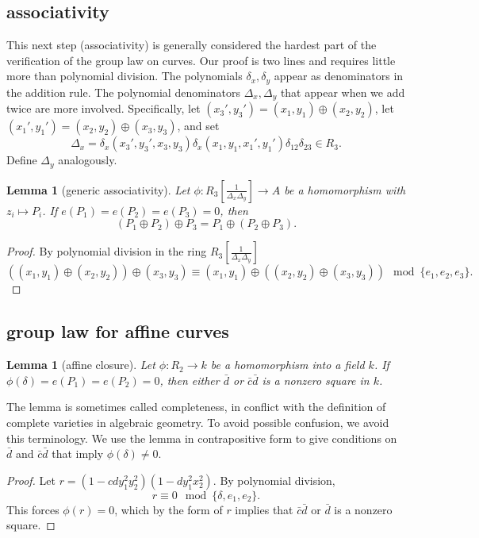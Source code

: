 \documentclass[12pt]{article}
\newtheorem{lemma}[theorem]{Lemma}
\newcommand{\f}[1]{\frac{1}{#1}}
\begin{document}
\subsection{associativity}

This next step (associativity) is generally considered the hardest
part of the verification of the group law on curves.  Our proof is two
lines and requires little more than polynomial division.  The
polynomials $\delta_x,\delta_y$ appear as denominators in the addition
rule.  The polynomial denominators $\Delta_x,\Delta_y$ that appear
when we add twice are more involved.  Specifically, let $
(x_3',y_3')=(x_1,y_1) \oplus (x_2,y_2)$, let $(x_1',y_1')=(x_2,y_2)
\oplus (x_3,y_3) $, and set
\[
\Delta_x = \delta_x(x_3',y_3',x_3,y_3)
\delta_x(x_1,y_1,x_1',y_1')\delta_{12}\delta_{23}\in R_3.
\]
Define $\Delta_y$ analogously.

\begin{lemma}[generic associativity] \label{lemma:assoc} Let
  $\phi:R_3[\f{\Delta_x\Delta_y}]\to A$ be a homomorphism with
  $z_i\mapsto P_i$.  If $e(P_1)=e(P_2)=e(P_3)=0$, then
\[
(P_1 \oplus P_2)\oplus P_3 = 
P_1 \oplus (P_2\oplus P_3).
\]
\end{lemma}

\begin{proof} By polynomial division in the
  ring $R_3[\f{\Delta_x\Delta_y}]$
\[
((x_1,y_1)\oplus (x_2,y_2)) \oplus (x_3,y_3)\equiv
(x_1,y_1)\oplus ((x_2,y_2) \oplus (x_3,y_3)) \mod \{e_1,e_2,e_3\}.
\]
\end{proof}

\subsection{group law for affine curves}

\begin{lemma}[affine closure] \label{lemma:affine} Let $\phi:R_2\to k$
  be a homomorphism into a field $k$.  If
  $\phi(\delta)=e(P_1)=e(P_2)=0$, then either $\bar d$ or $\bar c \bar
  d$ is a nonzero square in $k$.
\end{lemma}

The lemma is sometimes called completeness, in conflict with the
definition of complete varieties in algebraic geometry.  To avoid
possible confusion, we avoid this terminology.  We use the lemma in
contrapositive form to give conditions on $\bar d$ and $\bar c\bar d$
that imply $\phi(\delta)\ne0$.

\begin{proof} 
  Let $r = (1 - c d y_1^2 y_2 ^2) (1 - d y_1^2 x_2^2)$.  By polynomial
  division,
\begin{equation}\label{eqn:squares}
  r \equiv 0 \mod \{\delta,e_1,e_2\}.
\end{equation}
This forces $\phi(r)=0$, which by the form of $r$ implies that $\bar
c\bar d$ or $\bar d$ is a nonzero square.
\end{proof}
\end{document}
